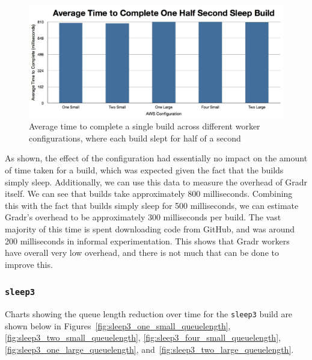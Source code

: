 \documentclass{scrartcl}
\begin{document}
\begin{figure}[h!]
  \begin{center}
    \includegraphics[scale=0.45]{raw_data/sleep0.5/time_to_complete_each.jpg}
  \end{center}
  \caption{Average time to complete a single build across different worker configurations, where each build slept for half of a second}
  \label{fig:sleephalf_each}
\end{figure}

As shown, the effect of the configuration had essentially no impact on the amount of time taken for a build, which was expected given the fact that the builds simply sleep.
Additionally, we can use this data to measure the overhead of Gradr itself.
We can see that builds take approximately 800 milliseconds.
Combining this with the fact that builds simply sleep for 500 milliseconds, we can estimate Gradr's overhead to be approximately 300 milliseconds per build.
The vast majority of this time is spent downloading code from GitHub, and was around 200 milliseconds in informal experimentation.
This shows that Gradr workers have overall very low overhead, and there is not much that can be done to improve this.

\subsubsection{\texttt{sleep3}}
\label{sec:sleep3}

Charts showing the queue length reduction over time for the \texttt{sleep3} build are shown below in Figures~\ref{fig:sleep3_one_small_queuelength}, \ref{fig:sleep3_two_small_queuelength}, \ref{fig:sleep3_four_small_queuelength}, \ref{fig:sleep3_one_large_queuelength}, and~\ref{fig:sleep3_two_large_queuelength}.
\end{document}
